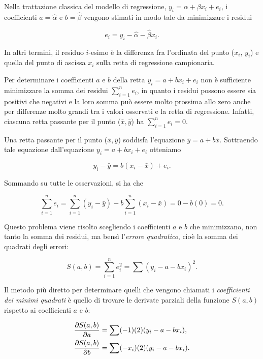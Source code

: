 \documentclass[
  11pt,
]{krantz}
\theoremstyle{definition}
\theoremstyle{definition}
\theoremstyle{definition}
\theoremstyle{definition}
\theoremstyle{remark}
\begin{document}
Nella trattazione classica del modello di regressione, \(y_i = \alpha + \beta x_i + e_i\), i coefficienti \(a = \hat{\alpha}\) e \(b = \hat{\beta}\) vengono stimati in modo tale da minimizzare i residui

\begin{equation}
e_i = y_i - \hat{\alpha} - \hat{\beta} x_i.
\label{eq:residuals}
\end{equation}

In altri termini, il residuo \(i\)-esimo è la differenza fra l'ordinata del punto (\(x_i\), \(y_i\)) e quella del punto di ascissa \(x_i\) sulla retta di regressione campionaria.

Per determinare i coefficienti \(a\) e \(b\) della retta \(y_i = a + b x_i + e_i\) non è sufficiente minimizzare la somma dei residui \(\sum_{i=1}^{n}e_i\), in quanto i residui possono essere sia positivi che negativi e la loro somma può essere molto prossima allo zero anche per differenze molto grandi tra i valori osservati e la retta di regressione. Infatti, ciascuna retta passante per il punto (\(\bar{x}, \bar{y}\)) ha \(\sum_{i=1}^{n}e_i=0\).

Una retta passante per il punto (\(\bar{x}, \bar{y}\)) soddisfa l'equazione \(\bar{y} = a + b \bar{x}\). Sottraendo tale equazione dall'equazione \(y_i = a + b x_i + e_i\) otteniamo

\[
y_i - \bar{y} =  b (x_i - \bar{x}) + e_i. 
\]

Sommando su tutte le osservazioni, si ha che

\begin{equation}
\sum_{i=1}^n e_i = \sum_{i=1}^n (y_i - \bar{y} ) -  b \sum_{i=1}^n (x_i - \bar{x}) = 0 - b(0) = 0. 
\label{eq:res-sum-zero}
\end{equation}

Questo problema viene risolto scegliendo i coefficienti \(a\) e \(b\) che minimizzano, non tanto la somma dei residui, ma bensì l'\emph{errore quadratico}, cioè la somma dei quadrati degli errori:

\begin{equation}
S(a, b) = \sum_{i=1}^{n} e_i^2 = \sum (y_i - a - b x_i)^2.
\end{equation}

Il metodo più diretto per determinare quelli che vengono chiamati i \emph{coefficienti dei minimi quadrati} è quello di trovare le derivate parziali della funzione \(S(a, b)\) rispetto ai coefficienti \(a\) e \(b\):

\begin{align}
\frac{\partial S(a,b)}{\partial a} &= \sum (-1)(2)(y_i - a - b x_i), \notag \\
\frac{\partial S(a,b)}{\partial b} &= \sum (-x_i)(2)(y_i - a - b x_i).
\end{align}
\end{document}
